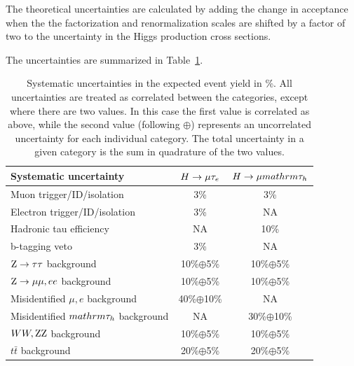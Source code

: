 \documentclass[oneside, letterpaper, oldfontcommands]{memoir}
\begin{document}
{{{The theoretical uncertainties are calculated by adding the change in acceptance when the the factorization and renormalization scales are shifted by a factor of two to the uncertainty in the Higgs production cross sections.

The uncertainties are summarized in Table~\ref{tab:systematics}.

\begin{table}[t]
 \centering
  \caption{
Systematic uncertainties in the expected event yield in \%. All uncertainties are treated as correlated between the categories, except where there are two values. In
this case the first value is correlated as above, while the second value (following $\oplus$) represents an uncorrelated uncertainty for each individual category.
The total uncertainty in a given category is the sum in quadrature of the two values.}
  \label{tab:systematics}
{
\begin{tabular}{l|c|c} \hline
Systematic  uncertainty                                &  $H \rightarrow \mu \mathrm{\tau}_{e}$ & $H \rightarrow \mu mathrm{\tau_{h}}$  \\ \hline
Muon  trigger/ID/isolation                             &              3\%           &    3\%   \\
Electron trigger/ID/isolation                          &              3\%           &    NA   \\
Hadronic tau efficiency                                &              NA           &    10\%  \\
b-tagging veto                                         &              3\%           &   NA    \\ \hline  \hline
$\mathrm{Z} \rightarrow \mathrm{\tau} \mathrm{\tau}$ background                        &              10\%$\oplus$5\%          &    10\%$\oplus$5\%  \\
$\mathrm{Z} \rightarrow \mu\mu,ee$ background                  &              10\%$\oplus$5\%          &    10\%$\oplus$5\%  \\
Misidentified $\mu,e$  background                   &              40\%$\oplus$10\%          &    NA   \\
Misidentified $mathrm{\tau_{h}}$  background                      &              NA           &    30\%$\oplus$10\%  \\
$WW,\mathrm{Z}\mathrm{Z}$ background               &              10\%$\oplus$5\%          &    10\%$\oplus$5\%  \\
$t\bar{t}$ background                                    &              20\%$\oplus$5\%          &    20\%$\oplus$5\%  \\

\end{tabular}}
\end{table}}}}
\end{document}
